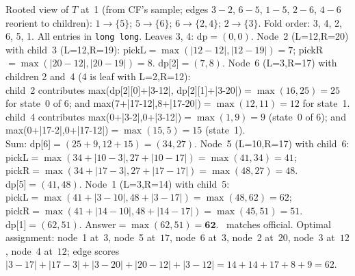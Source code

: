 \begin{tracebox}[Sample~3: $n=6$; ranges $(3,14)(12,20)(12,19)(2,12)(10,17)(3,17)$]
Rooted view of $T$ at~1 (from CF's sample; edges $3\!-\!2$, $6\!-\!5$,
$1\!-\!5$, $2\!-\!6$, $4\!-\!6$ reorient to children):
$1\!\to\!\{5\}$; $5\!\to\!\{6\}$; $6\!\to\!\{2,4\}$; $2\!\to\!\{3\}$.
Fold order: 3, 4, 2, 6, 5, 1.  All entries in \lstinline{long long}.
Leaves 3, 4: dp$=(0,0)$.
Node~2 (L=12,R=20) with child~3 (L=12,R=19): pickL$=\max(|12-12|,|12-19|)=7$;
pickR$=\max(|20-12|,|20-19|)=8$. dp[2]$=(7,8)$.
Node~6 (L=3,R=17) with children 2 and~4 (4 is leaf with L=2,R=12):\\
  child~2 contributes max(dp[2][0]+|3-12|, dp[2][1]+|3-20|)$=\max(16,25)=25$
  for state~0 of 6; and max(7+|17-12|,8+|17-20|)$=\max(12,11)=12$ for state~1.\\
  child~4 contributes max(0+|3-2|,0+|3-12|)$=\max(1,9)=9$ (state~0 of 6);
  and max(0+|17-2|,0+|17-12|)$=\max(15,5)=15$ (state~1).\\
  Sum: dp[6]$=(25+9,12+15)=(34,27)$.
Node~5 (L=10,R=17) with child~6:\\
  pickL$=\max(34+|10-3|,27+|10-17|)=\max(41,34)=41$;\\
  pickR$=\max(34+|17-3|,27+|17-17|)=\max(48,27)=48$.\\
  dp[5]$=(41,48)$.
Node~1 (L=3,R=14) with child~5:\\
  pickL$=\max(41+|3-10|,48+|3-17|)=\max(48,62)=62$;\\
  pickR$=\max(41+|14-10|,48+|14-17|)=\max(45,51)=51$.\\
  dp[1]$=(62,51)$.
Answer$=\max(62,51)=\mathbf{62}$. \checkmark\ matches official. Optimal
assignment: node~1 at~$3$, node~5 at~$17$, node~6 at~$3$, node~2 at~$20$,
node~3 at~$12$, node~4 at~$12$; edge scores $|3-17|+|17-3|+|3-20|+|20-12|+|3-12|=14+14+17+8+9=62$.
\end{tracebox}


